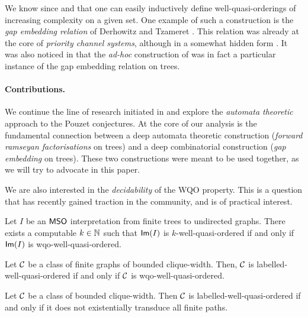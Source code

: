 We know since \cite{FREU20} and \cite{LOPEZ23a} that one can easily inductively
define well-quasi-orderings of increasing complexity on a given set. One
example of such a construction is the \emph{gap embedding relation} of
Derhowitz and Tzameret \cite{DERSHOWITZ200380}. This relation was already at
the core of \emph{priority channel systems}, although in a somewhat hidden form
\cite{HSS13}.  It was also noticed in \cite{LOPEZ24} that the \emph{ad-hoc}
construction of \cite{DRT10} was in fact a particular instance of the gap
embedding relation on trees.

\paragraph*{Contributions.} We continue the line of research initiated in
\cite{LOPEZ24} and explore the \emph{automata theoretic} approach to the Pouzet
conjectures. At the core of our analysis is the fundamental connection between
a deep automata theoretic construction (\emph{forward ramseyan factorisations}
on trees) and a deep combinatorial construction (\emph{gap embedding} on
trees). These two constructions were meant to be used together, as we will try
to advocate in this paper.

We are also interested in the \emph{decidability} of the WQO property. This is
a question that has recently gained traction in the community, and is of
practical interest.

\begin{theorem}[restate=effective-image:thm,title={}]
    \label{effective-image:thm}
    Let $I$ be an $\mathsf{MSO}$ interpretation
    from finite trees to undirected graphs.
    There exists a computable $k \in \mathbb{N}$
    such that $\mathsf{Im}(I)$
    is $k$-well-quasi-ordered
    if and only if 
    $\mathsf{Im}(I)$ is wqo-well-quasi-ordered.
\end{theorem}

\begin{theorem}[restate=pouzet2:thm]
    \label{pouzet-2:thm}
    Let $\mathcal{C}$ be a class of finite graphs of bounded clique-width.
    Then, $\mathcal{C}$ is labelled-well-quasi-ordered
    if and only if 
    $\mathcal{C}$ is wqo-well-quasi-ordered.
\end{theorem}

\begin{theorem}[restate=transductions-paths:thm]
    \label{transductions-paths:thm}
    Let $\mathcal{C}$ be a class of bounded clique-width.
    Then $\mathcal{C}$ is labelled-well-quasi-ordered
    if and only if
    it does not existentially transduce
    all finite paths.
\end{theorem}

